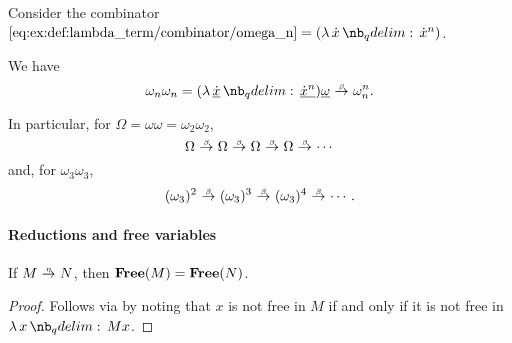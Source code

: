 \begin{example}
\begin{thmenum}
     Consider the combinator \( \ref{eq:ex:def:lambda_term/combinator/omega_n} = (\qabs \synx \synx^n) \).

    We have
    \begin{equation*}
      \omega_n \omega_n
      =
      (\qabs {\hi{\synx}} \hi{\synx^n}) \hi{\omega}
      \bred
      \omega_n^n.
    \end{equation*}

    In particular, for \( \Omega = \omega \omega = \omega_2 \omega_2 \),
    \begin{equation*}
      \Omega \bred \Omega \bred \Omega \bred \Omega \bred \cdots
    \end{equation*}
    and, for \( \omega_3 \omega_3 \),
    \begin{equation*}
      (\omega_3)^2 \bred (\omega_3)^3 \bred (\omega_3)^4 \bred \cdots.
    \end{equation*}
  \end{thmenum}
\end{example}

\paragraph{Reductions and free variables}

\begin{proposition}\label{thm:eta_reduction_free_variables}
  If \( M \ered N \), then \( \op*{Free}(M) = \op*{Free}(N) \).
\end{proposition}
\begin{proof}
  Follows via  by noting that \( x \) is not free in \( M \) if and only if it is not free in \( \qabs x M x \).
\end{proof}

